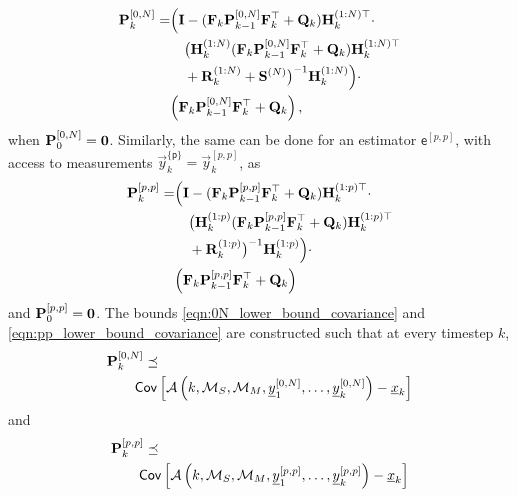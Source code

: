 \documentclass[letterpaper, 10 pt, conference]{ieeeconf}
\begin{document}
\begin{equation}\label{eqn:0N_lower_bound_covariance}
  \begin{split}
    {\ensuremath{{\mathbf{P}}}}_k^{[0,N]} =& \Bigl( {{\mathbf{I}}} - ({{\mathbf{F}}}_k{{\mathbf{P}}}_{k-1}^{[0,N]}{{\mathbf{F}}}_k^\top + {{\mathbf{Q}}}_k){{\mathbf{H}}}_k^{(1:N)\top} \cdot \\
    &\quad\bigl({{\mathbf{H}}}_k^{(1:N)}({{\mathbf{F}}}_k{{\mathbf{P}}}_{k-1}^{[0,N]}{{\mathbf{F}}}_k^\top + {{\mathbf{Q}}}_k){{\mathbf{H}}}_k^{(1:N)\top} \\
    &\quad+ {{\mathbf{R}}}_k^{(1:N)} + {{\mathbf{S}}}^{(N)}\bigr)^{-1}{{\mathbf{H}}}_k^{(1:N)}\Bigr)\cdot\\
    &\Bigl({{\mathbf{F}}}_k{{\mathbf{P}}}_{k-1}^{[0,N]}{{\mathbf{F}}}_k^\top + {{\mathbf{Q}}}_k\Bigr)\,,
 \end{split}
\end{equation}
when ${{\mathbf{P}}}_0^{[0,N]}={{\mathbf{0}}}$. Similarly, the same can be done for an estimator $\mathsf{e}^{[p,p]}$, with access to measurements $\vec{y}_k^{\{\mathsf{p}\}}=\vec{y}_k^{[p,p]}$, as
\begin{equation}\label{eqn:pp_lower_bound_covariance}
  \begin{split}
    {\ensuremath{{\mathbf{P}}}}_k^{[p,p]} =& \Bigl( {{\mathbf{I}}} - ({{\mathbf{F}}}_k{{\mathbf{P}}}_{k-1}^{[p,p]}{{\mathbf{F}}}_k^\top + {{\mathbf{Q}}}_k){{\mathbf{H}}}_k^{(1:p)\top} \cdot \\
    &\quad\bigl({{\mathbf{H}}}_k^{(1:p)}({{\mathbf{F}}}_k{{\mathbf{P}}}_{k-1}^{[p,p]}{{\mathbf{F}}}_k^\top + {{\mathbf{Q}}}_k){{\mathbf{H}}}_k^{(1:p)\top} \\
    &\quad+ {{\mathbf{R}}}_k^{(1:p)}\bigr)^{-1}{{\mathbf{H}}}_k^{(1:p)}\Bigr)\cdot\\
    &\Bigl({{\mathbf{F}}}_k{{\mathbf{P}}}_{k-1}^{[p,p]}{{\mathbf{F}}}_k^\top + {{\mathbf{Q}}}_k\Bigr)
  \end{split}
\end{equation}
and ${{\mathbf{P}}}_0^{[p,p]}={{\mathbf{0}}}$. The bounds \eqref{eqn:0N_lower_bound_covariance} and \eqref{eqn:pp_lower_bound_covariance} are constructed such that at every timestep $k$,
\begin{equation}\label{eqn:0N_cov_bound}
  \begin{split}
    &{{\mathbf{P}}}_k^{[0,N]} \preceq\\
    &\qquad \mathsf{Cov}\left[\mathcal{A}\left(k,\mathcal{M}_S,\mathcal{M}_M,{\underline{y}}_1^{[0,N]},\dots,{\underline{y}}_k^{[0,N]}\right) - {\underline{x}}_k\right]
  \end{split}
\end{equation}
and
\begin{equation}\label{eqn:pp_cov_bound}
  \begin{split}
    &{{\mathbf{P}}}_k^{[p,p]} \preceq\\
    &\qquad \mathsf{Cov}\left[\mathcal{A}\left(k,\mathcal{M}_S,\mathcal{M}_M,{\underline{y}}_1^{[p,p]},\dots,{\underline{y}}_k^{[p,p]}\right) - {\underline{x}}_k\right]
  \end{split}
\end{equation}
\end{document}
